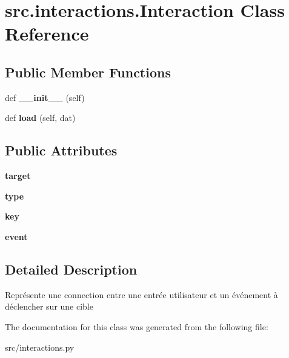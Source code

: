 \hypertarget{classsrc_1_1interactions_1_1_interaction}{}\section{src.\+interactions.\+Interaction Class Reference}
\label{classsrc_1_1interactions_1_1_interaction}
\subsection*{Public Member Functions}
\begin{DoxyCompactItemize}
\item 
\hypertarget{classsrc_1_1interactions_1_1_interaction_aaec5f130083bd4a28e8a47ff3623de8b}{}\label{classsrc_1_1interactions_1_1_interaction_aaec5f130083bd4a28e8a47ff3623de8b} 
def {\bfseries \+\_\+\+\_\+init\+\_\+\+\_\+} (self)
\item 
\hypertarget{classsrc_1_1interactions_1_1_interaction_ad2c6e2e141d36f2b5527f942339b3abc}{}\label{classsrc_1_1interactions_1_1_interaction_ad2c6e2e141d36f2b5527f942339b3abc} 
def {\bfseries load} (self, dat)
\end{DoxyCompactItemize}
\subsection*{Public Attributes}
\begin{DoxyCompactItemize}
\item 
\hypertarget{classsrc_1_1interactions_1_1_interaction_aa6b225873c444474bbcb0fa04f5a2b79}{}\label{classsrc_1_1interactions_1_1_interaction_aa6b225873c444474bbcb0fa04f5a2b79} 
{\bfseries target}
\item 
\hypertarget{classsrc_1_1interactions_1_1_interaction_a369604682845b60b1ce34140bd5afcc7}{}\label{classsrc_1_1interactions_1_1_interaction_a369604682845b60b1ce34140bd5afcc7} 
{\bfseries type}
\item 
\hypertarget{classsrc_1_1interactions_1_1_interaction_aecbbda5f45486fdf19ebf7c5ecdc8cd4}{}\label{classsrc_1_1interactions_1_1_interaction_aecbbda5f45486fdf19ebf7c5ecdc8cd4} 
{\bfseries key}
\item 
\hypertarget{classsrc_1_1interactions_1_1_interaction_a31bd7a270916c5de15cb60a677b77c07}{}\label{classsrc_1_1interactions_1_1_interaction_a31bd7a270916c5de15cb60a677b77c07} 
{\bfseries event}
\end{DoxyCompactItemize}


\subsection{Detailed Description}
\begin{DoxyVerb}Représente une connection entre une entrée utilisateur 
    et un événement à déclencher sur une cible \end{DoxyVerb}
 

The documentation for this class was generated from the following file\+:\begin{DoxyCompactItemize}
\item 
src/interactions.\+py\end{DoxyCompactItemize}
